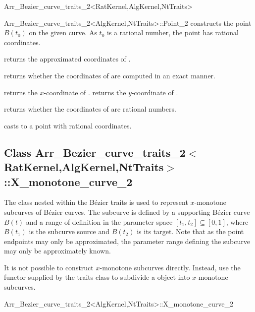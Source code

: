 \begin{ccRefClass}{Arr_Bezier_curve_traits_2<RatKernel,AlgKernel,NtTraits>}
\begin{ccClass}{Arr_Bezier_curve_traits_2<AlgKernel,NtTraits>::Point_2}
  {constructs the point $B(t_0)$ on the given curve. As $t_0$ is a
   rational number, the point has rational coordinates.}

\ccAccessFunctions

  {returns the approximated coordinates of \ccVar.}

  {returns whether the coordinates of \ccVar{} are computed in an exact manner.}

  {returns the $x$-coordinate of \ccVar.
   }
\ccGlue
{}
  {returns the $y$-coordinate of \ccVar.
   }

  {returns whether the coordinates of \ccVar{} are rational numbers.}

  {casts \ccVar{} to a point with rational coordinates.
   }

\end{ccClass}


\subsection*{Class 
Arr\_Bezier\_curve\_traits\_2$<$RatKernel,AlgKernel,NtTraits$>$::X\_monotone\_curve\_2}

The  class nested within the B\'ezier traits is
used to represent $x$-monotone subcurves of B\'ezier curves. The subcurve is
defined by a supporting B\'ezier curve $B(t)$ and a range of definition in
the parameter space $[t_1, t_2] \subseteq [0, 1]$, where $B(t_1)$ is the
subcurve source and $B(t_2)$ is its target. Note that as the point endpoints
may only be approximated, the parameter range defining the subcurve may
only be approximately known.

It is not possible to construct $x$-monotone subcurves directly. Instead,
use the  functor supplied by the traits class to
subdivide a  object into $x$-monotone subcurves.

\begin{ccClass}{Arr_Bezier_curve_traits_2<AlgKernel,NtTraits>::X_monotone_curve_2}


\end{ccClass}
\end{ccRefClass}
